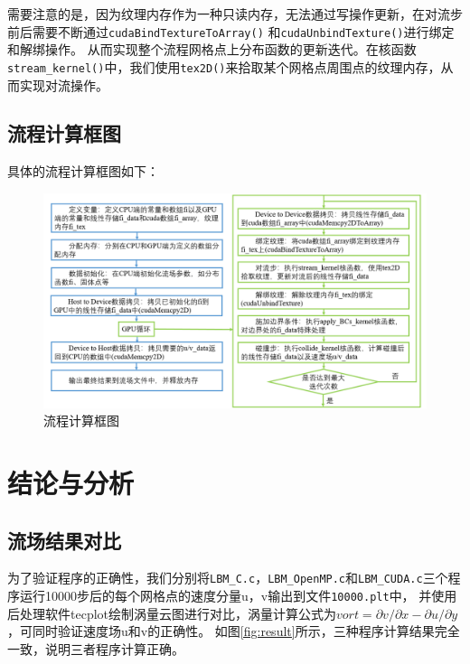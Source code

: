 \documentclass[UTF8]{ctexart}
\begin{document}
        需要注意的是，因为纹理内存作为一种只读内存，无法通过写操作更新，在对流步前后需要不断通过\texttt{cudaBindTextureToArray()}
        和\texttt{cudaUnbindTexture()}进行绑定和解绑操作。
        从而实现整个流程网格点上分布函数的更新迭代。在核函数\texttt{stream\_kernel()}中，我们使用\texttt{tex2D()}来拾取某个网格点周围点的纹理内存，从而实现对流操作。

        \newpage
        \subsection{流程计算框图}
        具体的流程计算框图如下：
        \begin{figure}[H]
            \centering
            \includegraphics[scale=0.4]{./figures/stream.png}
            \caption{\textup{\heiti 流程计算框图} }
            \label{fig:stream}
        \end{figure}

        \section{结论与分析}
        \subsection{流场结果对比}
        为了验证程序的正确性，我们分别将\texttt{LBM\_C.c}，\texttt{LBM\_OpenMP.c}和\texttt{LBM\_CUDA.c}三个程序运行10000步后的每个网格点的速度分量u，v输出到文件\texttt{10000.plt}中，
        并使用后处理软件tecplot绘制涡量云图进行对比，涡量计算公式为$vort=\partial v/\partial x-\partial u/\partial y$，可同时验证速度场u和v的正确性。
        如图\ref{fig:result}所示，三种程序计算结果完全一致，说明三者程序计算正确。
\end{document}
